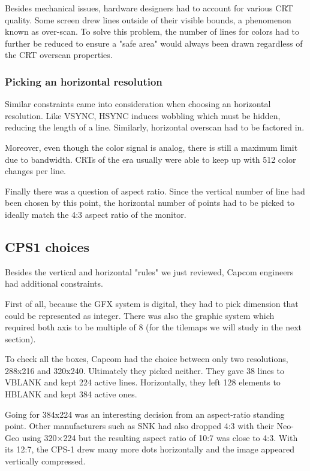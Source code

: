 Besides mechanical issues, hardware designers had to account for various CRT quality. Some screen drew lines outside of their visible bounds, a phenomenon known as over-scan. To solve this problem, the number of lines for colors had to further be reduced to ensure a "safe area" would always been drawn regardless of the CRT overscan properties.



\subsubsection{Picking an horizontal resolution}
Similar constraints came into consideration when choosing an horizontal resolution. Like VSYNC, HSYNC induces wobbling which must be hidden, reducing the length of a line. Similarly, horizontal overscan had to be factored in.

Moreover, even though the color signal is analog, there is still a maximum limit due to bandwidth. CRTs of the era usually were able to keep up with 512 color changes per line.

Finally there was a question of aspect ratio. Since the vertical number of line had been chosen by this point, the horizontal number of points had to be picked to ideally match the 4:3 aspect ratio of the monitor.


\subsection{CPS1 choices}
Besides the vertical and horizontal "rules" we just reviewed, Capcom engineers had additional constraints.

First of all, because the GFX system is digital, they had to pick dimension that could be represented as integer. There was also the graphic system which required both axis to be multiple of 8 (for the tilemaps we will study in the next section).

To check all the boxes, Capcom had the choice between only two resolutions, 288x216 and 320x240. Ultimately they picked neither. They gave 38 lines to VBLANK and kept 224 active lines\cite{petitCRT}. Horizontally, they left 128 elements to HBLANK and kept 384 active ones.  

Going for 384x224 was an interesting decision from an aspect-ratio standing point. Other manufacturers such as SNK had also dropped 4:3 with their Neo-Geo using 320×224 but the resulting aspect ratio of 10:7 was close to 4:3. With its 12:7, the CPS-1 drew many more dots horizontally and the image appeared vertically compressed. 



